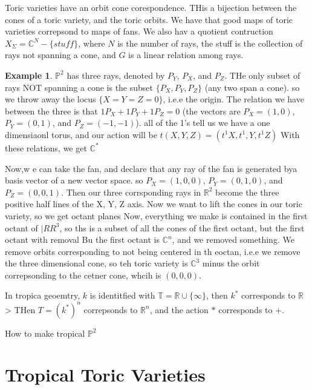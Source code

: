 \documentclass[11pt]{article}
\theoremstyle{definition}
\theoremstyle{plain}%
\theoremstyle{definition}
\newtheorem{protoexample}{Example}[section]
\newenvironment{ex}
   {\colorlet{shadecolor}{red!15}\begin{shaded}\begin{protoexample}}
   {\end{protoexample}\end{shaded}}
\def\RR{{\mathbb R}}
\def\CC{{\mathbb C}}
\def\TT{{\mathbb T}}
\def\PP{{\mathbb P}}
\begin{document}


Toric varieties have an orbit cone corespondence. THis a bijection between the cones of a toric variety, and the toric orbits.  We have that good maps of toric varieties correpsond to maps of fans. We also hav a quotient contruction $X_\Sigma = \CC^N - \{stuff\}$, where $N$ is the number of rays, the stuff is the collection of rays not spanning a cone, and $G$ is a linear relation among rays.

\begin{ex}
    $\PP^2$ has three rays, denoted by $P_Y$, $P_X$, and $P_Z$. THe only subset of rays NOT spanning a cone is the subset $\{P_X, P_Y, P_Z\}$ (any two span a cone). so we throw away the locus $\{X=Y=Z=0\}$, i.e.e the origin. The relation we have between the three is that $1P_X + 1 P_Y + 1 P_Z=0$ (the vectors are $P_X=(1,0)$, $P_Y=(0,1)$, and $P_Z=(-1,-1)$). all of the 1's tell us we have a one dimensiaonl torus, and our action will be $t(X,Y,Z) = (t^1 X,t^1,Y,t^1Z)$ With these relations, we get $\CC^*$

    Now,w e can take the fan, and declare that any ray of the fan is generated bya  basis vector of a new vector space. so $P_X=(1,0,0)$, $P_Y=(0,1,0)$, and $P_Z=(0,0,1)$. Then our three corrsponding rays in $\RR^2$ become the three positive half lines of the X, Y, Z axis. Now we want to lift the cones in our toric variety, so we get octant planes Now, everything we make is contained in the first octant of $|RR^3$, so ths is a subset of all the cones of the first octant, but the first octant with removal Bu the first octant is $\CC^n$, and we removed something. We remove orbits corresponding to not being centered in th eoctan, i.e.e we remove the three dimensional cone, so teh toric variety is $\CC^3$ minus the orbit correpsonding to the cetner cone, whcih is $(0,0,0)$.
\end{ex}





In tropica geoemtry, $k $ is identitfied with $\TT= \RR \cup \{\infty\}$, then $k^*$ corresponds to $\RR$> THen $T= (k^*)^n$ correpsonds to $\RR^n$, and the action $*$ corresponds to $+$. 



How to make tropical $\PP^2$



\section{Tropical Toric Varieties}
\end{document}

